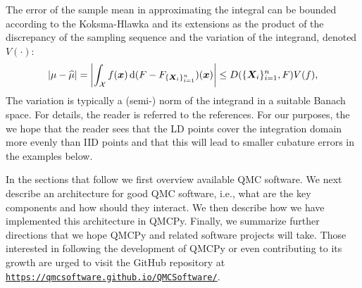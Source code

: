 \documentclass[graybox,footinfo]{svmult}
\newcommand{\hmu}{\widehat{\mu}}
\newcommand{\abs}[1]{\left \lvert #1 \right \rvert}
\begin{document}
The error of the sample mean in approximating the integral can be bounded according to the Koksma-Hlawka and its extensions as the product of the discrepancy of the sampling sequence and the variation of the integrand, denoted $V(\cdot)$:
\begin{equation}
	\abs{\mu - \hmu} = \abs{\int_{\calX} f(\bsx) \, \D (F - F_{\{\bsX_i\}_{i=1}^n}) (\bsx)} \le D(\{\bsX_i\}_{i=1}^n, F) V(f),
\end{equation} 
The variation is typically a (semi-) norm of the integrand in a suitable Banach space.  For details, the reader is referred to the references.  For our purposes, the we hope that the reader sees that the LD points cover the integration domain more evenly than IID points and that this will lead to smaller cubature errors in the examples below.

In the sections that follow we first overview available QMC software.  We next describe an architecture for good QMC software, i.e., what are the key components and how should they interact.  We then describe how we have implemented this architecture in QMCPy.  Finally, we summarize further directions that we hope QMCPy and related software projects will take.  Those interested in following the development of QMCPy or even contributing to its growth are urged to visit the GitHub repository at \href{https://qmcsoftware.github.io/QMCSoftware/}{\nolinkurl{https://qmcsoftware.github.io/QMCSoftware/}}.
\end{document}
